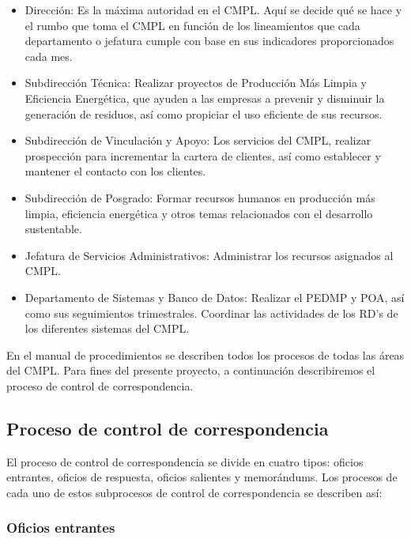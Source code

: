 	\begin{itemize}
		\item Dirección: Es la máxima autoridad en el CMPL. Aquí se decide qué se hace y el rumbo que toma el CMPL en función de los lineamientos que cada departamento o jefatura cumple con base en sus indicadores proporcionados cada mes.
		\item Subdirección Técnica: Realizar proyectos de Producción Más Limpia y Eficiencia Energética, que  ayuden a las empresas a prevenir y disminuir la generación de residuos, así como propiciar el uso eficiente de sus recursos. \cite{SIGTecnica}
		\item Subdirección de Vinculación y Apoyo: Los servicios del CMPL, realizar prospección para incrementar la cartera de clientes, así como establecer y mantener el contacto con los clientes. \cite{SIGVinculacion}
		\item Subdirección de Posgrado: Formar recursos humanos en producción más limpia, eficiencia energética y otros temas relacionados con el desarrollo sustentable. \cite{SIGPosgrado}
		\item Jefatura de Servicios Administrativos: Administrar los recursos asignados al CMPL. \cite{SIGAdministrativa}
		\item Departamento de Sistemas y Banco de Datos: Realizar el PEDMP y POA, así como sus seguimientos trimestrales. Coordinar las actividades de los RD's de los diferentes sistemas del CMPL. \cite{SIGSistemas}
	\end{itemize}
	
	En el manual de procedimientos se describen todos los procesos de todas las áreas del CMPL. Para fines del presente proyecto, a continuación describiremos el proceso de control de correspondencia.
	
	\subsection{Proceso de control de correspondencia}
	El proceso de control de correspondencia se divide en cuatro tipos: oficios entrantes, oficios de respuesta, oficios salientes y memorándums. Los procesos de cada uno de estos subprocesos de control de correspondencia se describen así:
	
	\subsubsection{Oficios entrantes}
	
